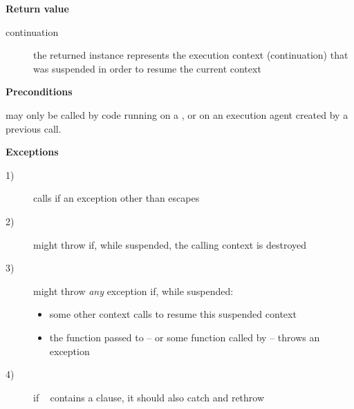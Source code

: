 {\bfseries Return value}
\begin{description}
    \item[continuation] the returned instance represents the execution context
                        (continuation) that was suspended in order to
                        resume the current context
\end{description}

{\bfseries Preconditions}
\begin{description}
    \item \callcc may only be called by code running on a ,
          or on an execution agent created by a previous \callcc call.
\end{description}

{\bfseries Exceptions}
\begin{description}
    \item[1)] calls  if an exception other than \unwindex
              escapes \entryfn\ 
    \item[2)] \callcc might throw \unwindex if, while suspended, the calling
              context is destroyed
    \item[3)] \callcc might throw \emph{any} exception if, while suspended:
              \begin{itemize}
                \item some other context calls \resumewith to resume this
                      suspended context
                \item the function  passed to \resumewith -- or some
                      function called by  -- throws an exception
              \end{itemize}
    \item[4)] if \entryfn\  contains a  clause, it
              should also catch and rethrow \unwindex
\end{description}

